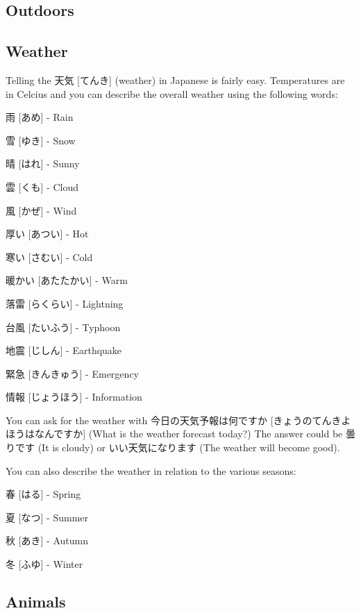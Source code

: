 \documentclass{article}
\begin{document}
\begin{CJK}{UTF8}{min}
\begin{multicols*}{3}
\clearpage

\section{Outdoors}

\subsection{Weather}

Telling the 天気 [てんき] (weather) in Japanese is fairly easy. Temperatures are in Celcius and you can describe the overall weather using the following words:

\begin{colorize}
\item 雨 [あめ] - Rain
\item 雪 [ゆき] - Snow
\item 晴 [はれ] - Sunny
\item 雲 [くも] - Cloud
\item 風 [かぜ] - Wind
\item 厚い [あつい] - Hot
\item 寒い [さむい] - Cold
\item 暖かい [あたたかい] - Warm
\item 落雷 [らくらい] - Lightning
\item 台風 [たいふう] - Typhoon
\item 地震 [じしん] - Earthquake
\item 緊急 [きんきゅう] - Emergency
\item 情報 [じょうほう] - Information
\end{colorize}

You can ask for the weather with 今日の天気予報は何ですか [きょうのてんきよほうはなんですか] (What is the weather forecast today?) The answer could be 曇りです (It is cloudy) or 
いい天気になります (The weather will become good).

You can also describe the weather in relation to the various seasons:

\begin{colorize}
\item 春 [はる] - Spring
\item 夏 [なつ] - Summer
\item 秋 [あき] - Autumn
\item 冬 [ふゆ] - Winter
\end{colorize}

\subsection{Animals}


\end{multicols*}
\end{CJK}
\end{document}
